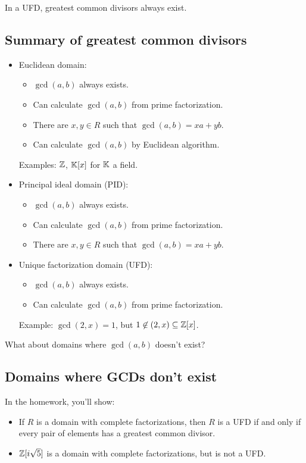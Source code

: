 \documentclass[12pt,letterpaper]{report}
\begin{document}
In a UFD, greatest common divisors always exist.

\pagebreak
\subsection{Summary of greatest common divisors}

\begin{itemize}
  \item Euclidean domain:
  \begin{itemize}
    \item $\gcd(a, b)$ always exists.
    \item Can calculate $\gcd(a, b)$ from prime factorization.
    \item There are $x, y \in R$ such that $\gcd(a, b) = xa + yb$.
    \item Can calculate $\gcd(a, b)$ by Euclidean algorithm.
  \end{itemize}
  Examples: $\mathbb{Z}$, $\mathbb{K}[x]$ for $\mathbb{K}$ a field.
  \item Principal ideal domain (PID):
  \begin{itemize}
    \item $\gcd(a, b)$ always exists.
    \item Can calculate $\gcd(a, b)$ from prime factorization.
    \item There are $x, y \in R$ such that $\gcd(a, b) = xa + yb$.
  \end{itemize}
  \item Unique factorization domain (UFD):
  \begin{itemize}
    \item $\gcd(a, b)$ always exists.
    \item Can calculate $\gcd(a, b)$ from prime factorization.
  \end{itemize}
  Example: $\gcd(2, x) = 1$, but $1 \not\in (2, x) \subseteq \mathbb{Z}[x]$.
\end{itemize}

What about domains where $\gcd(a, b)$ doesn't exist?

\pagebreak
\subsection{Domains where GCDs don't exist}

In the homework, you'll show:
\begin{itemize}
  \item If $R$ is a domain with complete factorizations, then $R$ is a UFD if and only if every
    pair of elements has a greatest common divisor.
  \item $\mathbb{Z}[i\sqrt{5}]$ is a domain with complete factorizations, but is not a UFD.
\end{itemize}
\end{document}
